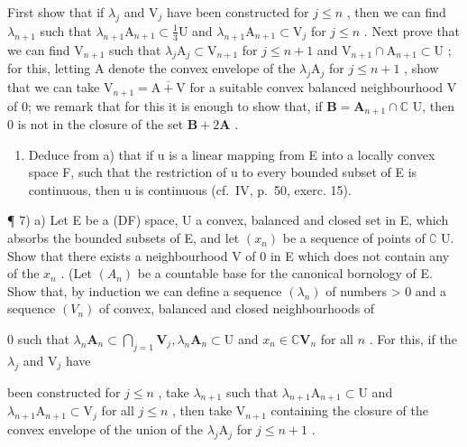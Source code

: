 First show that if \(\lambda_{j}\) and \(\mathrm{V}_j\) have been constructed for \(j\leqslant n\) , then we can find \(\lambda_{n + 1}\) such that \(\lambda_{n + 1}\mathrm{A}_{n + 1}\subset \frac{1}{3}\mathrm{U}\) and \(\lambda_{n + 1}\mathrm{A}_{n + 1}\subset \mathrm{V}_j\) for \(j\leqslant n\) . Next prove that we can find \(\mathrm{V}_{n + 1}\) such that \(\lambda_j\mathrm{A}_j\subset \mathrm{V}_{n + 1}\) for \(j\leqslant n + 1\) and \(\mathrm{V}_{n + 1}\cap \mathrm{A}_{n + 1}\subset \mathrm{U}\) ; for this, letting A denote the convex envelope of the \(\lambda_{j}\mathrm{A}_{j}\) for \(j\leqslant n + 1\) , show that we can take \(\mathrm{V}_{n + 1} = \overline{\mathrm{A} + \mathrm{V}}\) for a suitable convex balanced neighbourhood V of 0; we remark that for this it is enough to show that, if \(\mathbf{B} = \mathbf{A}_{n + 1}\cap \mathbb{C}\) U, then 0 is not in the closure of the set \(\mathbf{B} + 2\mathbf{A}\) .

\begin{enumerate}
\def\labelenumi{\alph{enumi})}
\setcounter{enumi}{1}
\tightlist
\item
  Deduce from a) that if u is a linear mapping from E into a locally convex space F, such that the restriction of u to every bounded subset of E is continuous, then u is continuous (cf.~IV, p.~50, exerc. 15).
\end{enumerate}

¶ 7) a) Let E be a (DF) space, U a convex, balanced and closed set in E, which absorbs the bounded subsets of E, and let \((x_n)\) be a sequence of points of \(\complement\) U. Show that there exists a neighbourhood V of 0 in E which does not contain any of the \(x_n\) . (Let \((A_n)\) be a countable base for the canonical bornology of E. Show that, by induction we can define a sequence \((\lambda_n)\) of numbers \textgreater{} 0 and a sequence \((V_n)\) of convex, balanced and closed neighbourhoods of

0 such that \(\lambda_{n}\mathbf{A}_{n}\subset \bigcap_{j = 1}\mathbf{V}_{j},\lambda_{n}\mathbf{A}_{n}\subset \mathrm{U}\) and \(x_{n}\in \mathbb{C}\mathbf{V}_{n}\) for all \(n\) . For this, if the \(\lambda_{j}\) and \(\mathrm{V}_j\) have

been constructed for \(j \leqslant n\) , take \(\lambda_{n+1}\) such that \(\lambda_{n+1}\mathrm{A}_{n+1} \subset \mathrm{U}\) and \(\lambda_{n+1}\mathrm{A}_{n+1} \subset \mathrm{V}_j\) for all \(j \leqslant n\) , then take \(\mathrm{V}_{n+1}\) containing the closure of the convex envelope of the union of the \(\lambda_j\mathrm{A}_j\) for \(j \leqslant n + 1\) .

